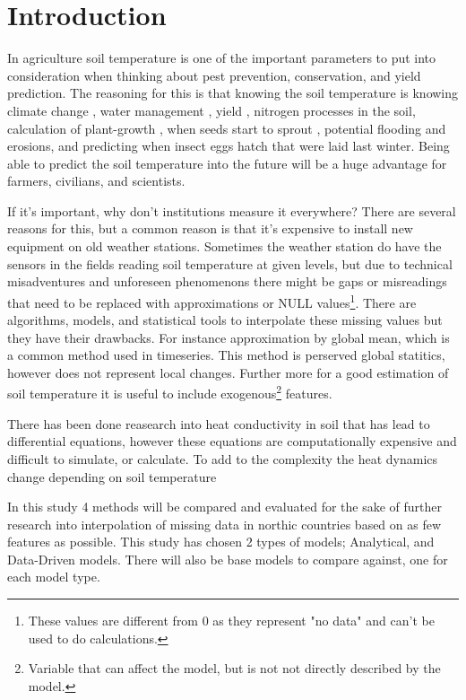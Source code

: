 \section{Introduction}

In agriculture soil temperature is one of the important parameters to put into consideration when thinking about pest prevention, conservation, and yield prediction. The reasoning for this is that knowing the soil temperature is knowing climate change \cite{li_attention-aware_2022}, water management \cite{alizamir_advanced_2020}, yield \cite{sim_prediction_2020}, nitrogen processes \cite{rankinen_simple_2004} in the soil, calculation of plant-growth \cite{li_modeling_2020}, when seeds start to sprout \cite{li_modeling_2020}, potential flooding and erosions\cite{stuurop_influence_2022}, and predicting when insect eggs hatch that were laid last winter. Being able to predict the soil temperature into the future will be a huge advantage for farmers, civilians, and scientists.

If it's important, why don't institutions measure it everywhere? There are several reasons for this, but a common reason is that it's expensive to install new equipment on old weather stations. Sometimes the weather station do have the sensors in the fields reading soil temperature at given levels, but due to technical misadventures and unforeseen phenomenons there might be gaps or misreadings that need to be replaced with approximations or NULL values\footnote{These values are different from 0 as they represent "no data" and can't be used to do calculations.}. There are algorithms, models, and statistical tools to interpolate these missing values but they have their drawbacks. For instance approximation by global mean, which is a common method used in timeseries\cite{lepot_interpolation_2017}. This method is perserved global statitics, however does not represent local changes. Further more for a good estimation of soil temperature it is useful to include exogenous\footnote{Variable that can affect the model, but is not not directly described by the model.} features.

There has been done reasearch into heat conductivity in soil that has lead to differential equations\cite{karvonen_model_1988}, however these equations\cite{fourier_analytical_2009,karvonen_model_1988} are computationally expensive and difficult to simulate, or calculate\cite{rankinen_simple_2004}. To add to the complexity the heat dynamics change depending on soil temperature

In this study 4 methods will be compared and evaluated for the sake of further research into interpolation of missing data in northic countries based on as few features as possible. This study has chosen 2 types of models; Analytical, and Data-Driven models. There will also be base models to compare against, one for each model type. 

